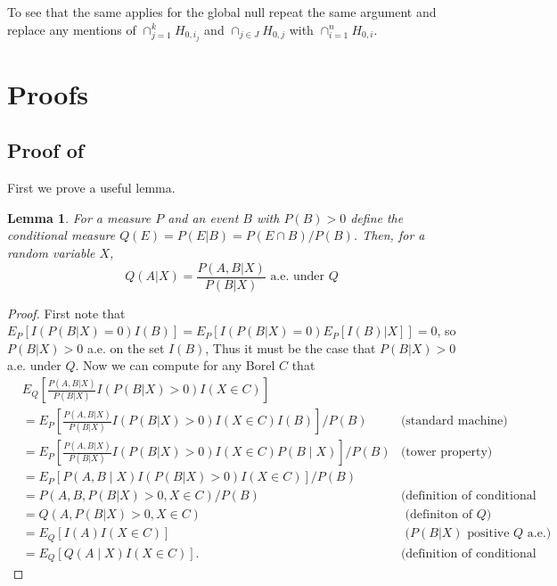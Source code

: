\documentclass{article}
\newtheorem{lemma}{Lemma}
\begin{document}
\begin{appendix}
To see that the same applies for the global null repeat the same argument and replace any mentions of $\cap_{j = 1}^k H_{0, i_j}$ and $\cap_{j \in J} H_{0, j}$ with $\cap_{i=1}^n H_{0, i}$. 

\section{Proofs}
\label{sec:proofs_appdx}

\subsection{Proof of }
\label{sec:adjustment_proof}

First we prove a useful lemma.

\begin{lemma}
    \label{lem:ce}
    For a measure $P$ and an event $B$ with $P(B)> 0$ define the conditional measure $Q(E) = P(E| B) = P(E \cap B)/P(B)$. Then, for a random variable $X$, 
    \begin{equation*}
        Q(A | X) = \frac{P(A, B | X) }{ P(B | X) } \text{ a.e. under } Q
    \end{equation*} 
\end{lemma}

\begin{proof}

    First note that $E_P[I( P(B| X) = 0 )  I(B)] = E_P[I( P(B| X) = 0 )  E_P[ I(B) | X] ] = 0$, so $P(B | X) > 0$ a.e. on the set $I(B)$, Thus it must be the case that $P(B | X) > 0 $ a.e. under $Q$. Now we can compute for any Borel $C$ that  
    \begin{align*}
    &E_Q\left[\frac{P(A, B | X) }{ P(B | X) } I(P(B|X) > 0) I(X \in C) \right] \\
    &= E_P\left[\frac{P(A, B | X) }{ P(B | X) } I(P(B| X) > 0) I(X \in C) I(B)\right] / P(B)  & \text{(standard machine)}\\
    &= E_P\left[\frac{P(A, B | X) }{ P(B | X) } I(P(B| X) > 0) I(X \in C) P(B \mid X)\right] / P(B) & \text{(tower property)}  \\
    &= E_P[P(A, B \mid X) I(P(B|X) > 0) I(X \in C)] / P(B) & \\
    &= P(A, B, P(B|X) > 0, X \in C) / P(B) & \text{(definition of conditional expectation)}\\
    &= Q(A, P(B|X) > 0, X \in C) & \text{ (definiton of $Q$)}\\
    &= E_Q[I(A) I(X \in C)] & \text{ ($P(B|X)$ positive $Q$ a.e.)}\\ 
    &= E_Q[Q(A \mid X) I(X \in C)]. & \text{(definition of conditional expectation)}
    \end{align*}


\end{proof}
\end{appendix}
\end{document}

